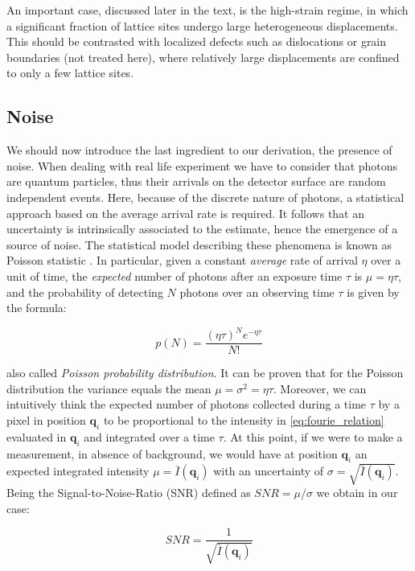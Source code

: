 An important case, discussed later in the text, is the high-strain regime, in which a significant fraction of lattice 
sites undergo large heterogeneous displacements. This should be contrasted with localized defects such as dislocations 
or grain boundaries (not treated here), where relatively large displacements are confined to only a few lattice sites.

\subsection{Noise}

We should now introduce the last ingredient to our derivation, the presence of noise. 
When dealing with real life experiment we have to consider that photons are quantum particles, thus their arrivals on 
the detector surface are random independent events. Here, because of the discrete nature of photons, a statistical approach 
based on the average arrival rate is required. It follows that an uncertainty is intrinsically associated to the estimate, 
hence the emergence of a source of noise. The statistical model describing these phenomena is known as Poisson 
statistic \cite{Poisson}. In particular, given a constant \textit{average} rate of arrival $\eta$ over a unit 
of time, the \textit{expected} number of photons after an exposure time $\tau$ is $\mu = \eta \tau$, and the probability 
of detecting $N$ photons over an observing time $\tau$ is given by the formula: 

\begin{equation}
    p(N) =  \frac{(\eta \tau)^N e^{-\eta \tau}}{N!}
    \label{eq:poisson}
\end{equation}

also called \textit{Poisson probability distribution}. It can be proven that for the Poisson distribution 
the variance equals the mean $\mu = \sigma^2 = \eta \tau $. Moreover, we can intuitively think the expected number of photons 
collected during a time $\tau$ by a pixel in position $\mathbf{q}_i$ to be proportional to the intensity in \ref{eq:fourie_relation}
evaluated in $\mathbf{q}_i$ and integrated over a time $\tau$.
At this point, if we were to make a measurement, in absence of background, we would have at position $\mathbf{q}_i$ an 
expected integrated intensity $\mu = \bar{I}(\mathbf{q}_i)$ with an uncertainty of $ \sigma = \sqrt{\bar{I}(\mathbf{q}_i)}$. 
Being the Signal-to-Noise-Ratio (SNR) defined as $SNR = \mu / \sigma$ we obtain in our case: 

\begin{equation}
    SNR =  \frac{1}{\sqrt{\bar{I}(\mathbf{q}_i)}} 
    \label{eq:SNR}
\end{equation}

